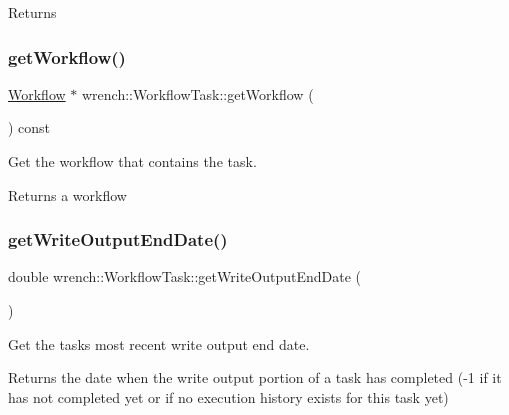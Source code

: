 \begin{DoxyReturn}{Returns}

\end{DoxyReturn}
\mbox{\label{classwrench_1_1_workflow_task_aea29ebd47e1e3a1b955fafc0e72dff50}} 
\subsubsection{\texorpdfstring{get\+Workflow()}{getWorkflow()}}
{\footnotesize\ttfamily \hyperlink{classwrench_1_1_workflow}{Workflow} $\ast$ wrench\+::\+Workflow\+Task\+::get\+Workflow (\begin{DoxyParamCaption}{ }\end{DoxyParamCaption}) const}



Get the workflow that contains the task. 

\begin{DoxyReturn}{Returns}
a workflow 
\end{DoxyReturn}
\mbox{\label{classwrench_1_1_workflow_task_aa9a538645c4946f7a257d66a80d45401}} 
\subsubsection{\texorpdfstring{get\+Write\+Output\+End\+Date()}{getWriteOutputEndDate()}}
{\footnotesize\ttfamily double wrench\+::\+Workflow\+Task\+::get\+Write\+Output\+End\+Date (\begin{DoxyParamCaption}{ }\end{DoxyParamCaption})}



Get the task\textquotesingle{}s most recent write output end date. 

\begin{DoxyReturn}{Returns}
the date when the write output portion of a task has completed (-\/1 if it has not completed yet or if no execution history exists for this task yet) 
\end{DoxyReturn}
\mbox{\label{classwrench_1_1_workflow_task_a2905c939f467778439fea8a956b0381b}} 
